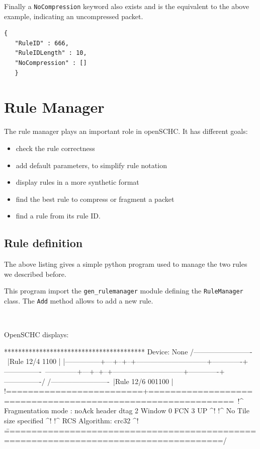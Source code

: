 Finally a \texttt{NoCompression} keyword also exists and is the equivalent to the above example, indicating an uncompressed packet.

\begin{lstlisting}[backgroundcolor=\color{yellow}]
   {
   "RuleID" : 666,
   "RuleIDLength" : 10,
   "NoCompression" : []
   }
\end{lstlisting}


\section{Rule Manager}

The rule manager plays an important role in openSCHC. It has different goals:
\begin{itemize}
    \item check the rule correctness
    \item add default parameters, to simplify rule notation
    \item display rules in a more synthetic format
    \item find the best rule to compress or fragment a packet
    \item find a rule from its rule ID.
\end{itemize}

\subsection{Rule definition}

The above listing gives a simple python program used to manage the two rules we described before. 


This program import the \texttt{gen\_rulemanager} module defining the \texttt{RuleManager} class. The \texttt{Add} method allows to add a new rule.

~~~

OpenSCHC displays:

\begin{termc}[backgroundcolor=\color{palerod}, basicstyle=\ttfamily\tiny, escapechar=@]
****************************************
Device: None
/-------------------------\
|Rule 12/4          1100  |
|---------------+---+--+--+------------------------------+-------------+----------------\
\---------------+---+--+--+------------------------------+-------------+----------------/
/-------------------------\
|Rule 12/6        001100  |
!=========================+=============================================================\
!^ Fragmentation mode : noAck    header dtag 2 Window  0 FCN  3                     UP ^!
!^ No Tile size specified                                                              ^!
!^ RCS Algorithm: crc32                                                                ^!
\=======================================================================================/
\end{termc}

